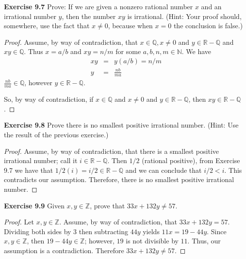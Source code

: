 \documentclass[12pt,oneside]{article}
\newenvironment{exercise}[1]{\vspace{.1in}\noindent\textbf{Exercise #1 \hspace{.05em}}}{}
\newcommand{\R}{\mathbb{R}}
\newcommand{\Z}{\mathbb{Z}}
\newcommand{\Q}{\mathbb{Q}}
\newcommand{\N}{\mathbb{N}}
\begin{document}

\begin{exercise}{9.7}
Prove: If we are given a nonzero rational number $x$ and an irrational number $y$, then the number $xy$ is irrational. (Hint: Your proof should, somewhere, use the fact that $x \neq 0$, because when $x = 0$ the conclusion is false.)
\end{exercise}

\begin{proof}
Assume, by way of contradiction, that $x \in \Q, x \neq 0$ and $y \in \R - \Q$ and $xy \in \Q$. Thus $x = a/b$ and $xy = n/m$ for some $a,b,n,m \in \N$. We have
\begin{eqnarray*}
xy &=& y(a/b) = n/m \\
y &=& \frac{nb}{ma}
\end{eqnarray*}
$\frac{nb}{ma} \in \Q$, however $y \in \R - \Q$.

So, by way of contradiction, if $x \in \Q$ and $x \neq 0$ and $y \in \R - \Q$, then $xy \in \R - \Q$.
\end{proof}



\begin{exercise}{9.8}
Prove there is no smallest positive irrational number. (Hint: Use the result of the previous exercise.)
\end{exercise}

\begin{proof}
Assume, by way of contradiction, that there is a smallest positive irrational number; call it $i \in \R - \Q$. Then $1/2$ (rational positive), from Exercise 9.7 we have that $1/2(i) = i/2 \in \R - \Q$ and we can conclude that $i/2 < i$. This contradicts our assumption. Therefore, there is no smallest positive irrational number.
\end{proof}



\begin{exercise}{9.9}
Given $x, y \in \Z$, prove that $33x + 132y \neq 57$.
\end{exercise}

\begin{proof}
Let $x, y \in \Z$. Assume, by way of contradiction, that $33x + 132y = 57$. Dividing both sides by $3$ then subtracting $44y$ yields $11x = 19 - 44y$. Since $x, y \in \Z$, then $19 - 44y \in \Z$; however, $19$ is not divisible by $11$. Thus, our assumption is a contradiction. Therefore $33x + 132y \neq 57$.
\end{proof}


\end{document}
